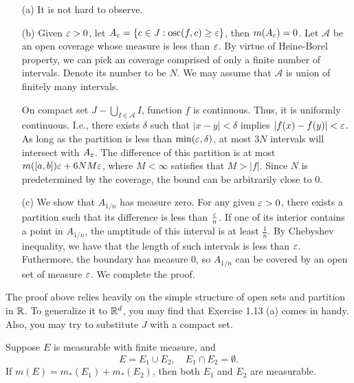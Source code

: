 \begin{Solution}
  \begin{itemize}
    \item [(a)] It is not hard to observe.
    \item [(b)] Given $\varepsilon>0$, let $A_\varepsilon=\{c\in J: \text{osc}(f,c)\geq\varepsilon\}$, then $m(A_\varepsilon)=0$. Let $\mathcal{A}$ be an open coverage whose measure is less than $\varepsilon$. By virtue of Heine-Borel property, we can pick an coverage comprised of only a finite number of intervals. Denote its number to be $N$. We may assume that $\mathcal{A}$ is union of finitely many intervals.
    
    On compact set $J-\bigcup_{I\in\mathcal{A}}I$, function $f$ is continuous. Thus, it is uniformly continuous. I.e., there exists $\delta$ such that $|x-y|<\delta$ implies $|f(x)-f(y)|<\varepsilon$.
    As long as the partition is less than $\min(\varepsilon,\delta)$, at most $3N$ intervals will intersect with $A_\varepsilon$. The difference of this partition is at most $m([a,b])\varepsilon+6NM\varepsilon$, where $M<\infty$ satisfies that $M>|f|$. Since $N$ is predetermined by the coverage, the bound can be arbitrarily close to 0.
    \item [(c)] We show that $A_{1/n}$ has measure zero. For any given $\varepsilon>0$, there exists a partition such that its difference is less than $\frac{\varepsilon}{n}$. If one of its interior contains a point in $A_{1/n}$, the amptitude of this interval is at least $\frac1n$. By Chebyshev inequality, we have that the length of such intervals is less than $\varepsilon$. Futhermore, the boundary has measure 0, so $A_{1/n}$ can be covered by an open set of measure $\varepsilon$. We complete the proof.
  \end{itemize} 
\end{Solution}

\begin{note}
  The proof above relies heavily on the simple structure of open sets and partition in $\mathbb{R}$. To generalize it to $\mathbb{R}^d$, you may find that Exercise 1.13 (a) comes in handy. Also, you may try to substitute $J$ with a compact set.
\end{note}

\begin{Problem}[5]
  Suppose $E$ is measurable with finite measure, and
  $$
  E=E_1\cup E_2,\quad E_1\cap E_2=\emptyset.
  $$
  If $m(E)=m_*(E_1)+m_*(E_2)$, then both $E_1$ and $E_2$ are measurable.
\end{Problem}



